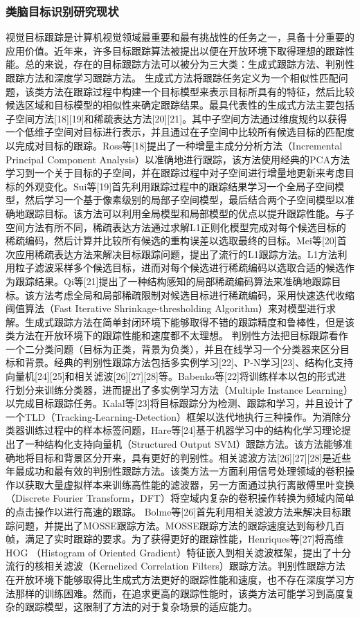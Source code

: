 \documentclass[a4paper,zihao=-4]{article}
\begin{document}
\subsubsection{类脑目标识别研究现状}
视觉目标跟踪是计算机视觉领域最重要和最有挑战性的任务之一，具备十分重要的应用价值。近年来，许多目标跟踪算法被提出以便在开放环境下取得理想的跟踪性能。总的来说，存在的目标跟踪方法可以被分为三大类：生成式跟踪方法、判别性跟踪方法和深度学习跟踪方法。
生成式方法将跟踪任务定义为一个相似性匹配问题，该类方法在跟踪过程中构建一个目标模型来表示目标所具有的特征，然后比较候选区域和目标模型的相似性来确定跟踪结果。最具代表性的生成式方法主要包括子空间方法[18][19]和稀疏表达方法[20][21]。其中子空间方法通过维度规约以获得一个低维子空间对目标进行表示，并且通过在子空间中比较所有候选目标的匹配度以完成对目标的跟踪。Ross等[18]提出了一种增量主成分分析方法（Incremental Principal Component Analysis）以准确地进行跟踪，该方法使用经典的PCA方法学习到一个关于目标的子空间，并在跟踪过程中对子空间进行增量地更新来考虑目标的外观变化。Sui等[19]首先利用跟踪过程中的跟踪结果学习一个全局子空间模型，然后学习一个基于像素级别的局部子空间模型，最后结合两个子空间模型以准确地跟踪目标。该方法可以利用全局模型和局部模型的优点以提升跟踪性能。与子空间方法有所不同，稀疏表达方法通过求解L1正则化模型完成对每个候选目标的稀疏编码，然后计算并比较所有候选的重构误差以选取最终的目标。Mei等[20]首次应用稀疏表达方法来解决目标跟踪问题，提出了流行的L1跟踪方法。L1方法利用粒子滤波采样多个候选目标，进而对每个候选进行稀疏编码以选取合适的候选作为跟踪结果。Qi等[21]提出了一种结构感知的局部稀疏编码算法来准确地跟踪目标。该方法考虑全局和局部稀疏限制对候选目标进行稀疏编码，采用快速迭代收缩阈值算法（Fast Iterative Shrinkage-thresholding Algorithm）来对模型进行求解。生成式跟踪方法在简单封闭环境下能够取得不错的跟踪精度和鲁棒性，但是该类方法在开放环境下的跟踪性能和速度都不太理想。
判别性方法把目标跟踪看作一个二分类问题（目标为正类，背景为负类），并且在线学习一个分类器来区分目标和背景。经典的判别性跟踪方法包括多实例学习[22]、P-N学习[23]、结构化支持向量机[24][25]和相关滤波[26][27][28]等。Babenko等[22]将训练样本以包的形式进行划分来训练分类器，进而提出了多实例学习方法（Multiple Instance Learning）以完成目标跟踪任务。Kalal等[23]将目标跟踪分为检测、跟踪和学习，并且设计了一个TLD（Tracking-Learning-Detection）框架以迭代地执行三种操作。为消除分类器训练过程中的样本标签问题，Hare等[24]基于机器学习中的结构化学习理论提出了一种结构化支持向量机（Structured Output SVM）跟踪方法。该方法能够准确地将目标和背景区分开来，具有更好的判别性。相关滤波方法[26][27][28]是近些年最成功和最有效的判别性跟踪方法。该类方法一方面利用信号处理领域的卷积操作以获取大量虚拟样本来训练高性能的滤波器，另一方面通过执行离散傅里叶变换（Discrete Fourier Transform，DFT）将空域内复杂的卷积操作转换为频域内简单的点击操作以进行高速的跟踪。 Bolme等[26]首先利用相关滤波方法来解决目标跟踪问题，并提出了MOSSE跟踪方法。MOSSE跟踪方法的跟踪速度达到每秒几百帧，满足了实时跟踪的要求。为了获得更好的跟踪性能，Henriques等[27]将高维HOG （Histogram of Oriented Gradient）特征嵌入到相关滤波框架，提出了十分流行的核相关滤波（Kernelized Correlation Filters）跟踪方法。判别性跟踪方法在开放环境下能够取得比生成式方法更好的跟踪性能和速度，也不存在深度学习方法那样的训练困难。然而，在追求更高的跟踪性能时，该类方法可能学习到高度复杂的跟踪模型，这限制了方法的对于复杂场景的适应能力。
\end{document}
